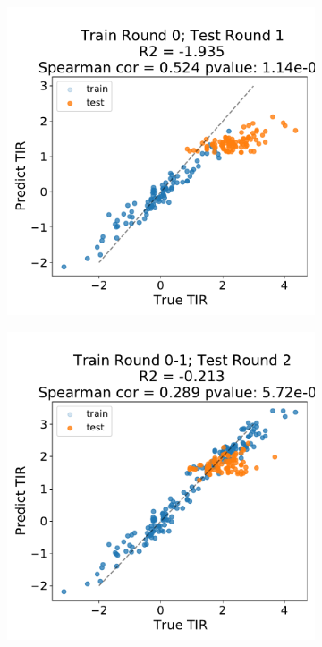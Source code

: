 \documentclass{scrartcl}[2013/05/29]%
\begin{document}
\begin{figure}[!ht]
    \centering
    \begin{subfigure}[b]{0.49\textwidth}
        \centering
        \caption{}
        \includegraphics[scale=0.4]{plots/Supplementary/scatter_abc1_FF_0_salis.pdf}
    \end{subfigure}
    \begin{subfigure}[b]{0.49\textwidth}
        \centering
        \caption{}
        \includegraphics[scale=0.4]{plots/Supplementary/scatter_abc1_FF_1_salis.pdf}

\end{subfigure}
\end{figure}
\end{document}
